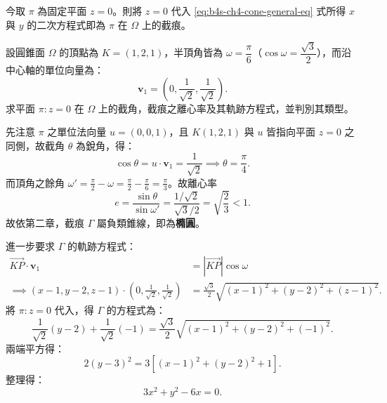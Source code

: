 今取 $\pi$ 為固定平面 $z = 0$。則將 $z = 0$ 代入 \eqref{eq:b4s-ch4-cone-general-eq} 式所得 $x$ 與 $y$ 的二次方程式即為 $\pi$ 在 $\Omega$ 上的截痕。

\begin{discussion}
設圓錐面 $\Omega$ 的頂點為 $K = (1, 2, 1)$，半頂角皆為 $\omega = \dfrac{\pi}{6}$（$\cos\omega = \dfrac{\sqrt{3}}{2}$），而沿中心軸的單位向量為：
\[
\mathbf{v}_1 = \left(0, \frac{1}{\sqrt{2}}, \frac{1}{\sqrt{2}}\right).
\]
求平面 $\pi: z = 0$ 在 $\Omega$ 上的截角，截痕之離心率及其軌跡方程式，並判別其類型。
\end{discussion}

\begin{solution}
先注意 $\pi$ 之單位法向量 $u = (0, 0, 1)$，且 $K(1, 2, 1)$ 與 $u$ 皆指向平面 $z = 0$ 之同側，故截角 $\theta$ 為銳角，得：
\[
\cos\theta = u \cdot \mathbf{v}_1 = \frac{1}{\sqrt{2}} \implies \theta = \frac{\pi}{4}.
\]
而頂角之餘角 $\omega' = \frac{\pi}{2} - \omega = \frac{\pi}{2} - \frac{\pi}{6} = \frac{\pi}{3}$。故離心率
\[
e = \frac{\sin\theta}{\sin\omega'} = \frac{1/\sqrt{2}}{\sqrt{3}/2} = \sqrt{\frac{2}{3}} < 1.
\]
故依第二章，截痕 $\Gamma$ 屬負類錐線，即為\textbf{橢圓}。

進一步要求 $\Gamma$ 的軌跡方程式：
\[
\begin{aligned}
\vec{KP} \cdot \mathbf{v}_1 &= |\vec{KP}| \cos\omega \\
\implies (x - 1, y - 2, z - 1) \cdot \left(0, \frac{1}{\sqrt{2}}, \frac{1}{\sqrt{2}}\right) &= \frac{\sqrt{3}}{2} \sqrt{(x - 1)^2 + (y - 2)^2 + (z - 1)^2}.
\end{aligned}
\]
將 $\pi: z = 0$ 代入，得 $\Gamma$ 的方程式為：
\[
\frac{1}{\sqrt{2}}(y - 2) + \frac{1}{\sqrt{2}}(-1) = \frac{\sqrt{3}}{2}\sqrt{(x - 1)^2 + (y - 2)^2 + (-1)^2}.
\]
兩端平方得：
\[
2(y - 3)^2 = 3[(x - 1)^2 + (y - 2)^2 + 1].
\]
整理得：
\begin{equation}
3x^2 + y^2 - 6x = 0.
\label{eq:b4s-ch4-ex16-ellipse}
\end{equation}

\begin{figure}[htbp]
\centering
{}
\end{figure}
\end{solution}
